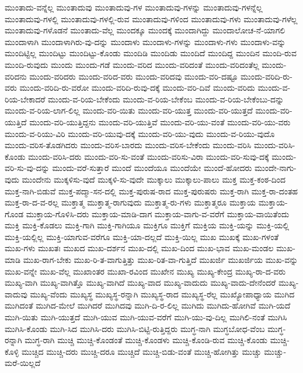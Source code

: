 {ಮುಂತಾದು-ವನ್ನೆಲ್ಲ
ಮುಂತಾದುವು
ಮುಂತಾದುವು-ಗಳ
ಮುಂತಾದುವು-ಗಳನ್ನು
ಮುಂತಾದುವು-ಗಳನ್ನೆಲ್ಲ
ಮುಂತಾದುವು-ಗಳಲ್ಲಿ
ಮುಂತಾದುವು-ಗಳಲ್ಲಿ-ರುವ
ಮುಂತಾದುವು-ಗಳಿಂದ
ಮುಂತಾದುವು-ಗಳು
ಮುಂತಾದುವು-ಗಳೆಲ್ಲ
ಮುಂತಾದುವು-ಗಳೊಡನೆ
ಮುಂತಾದು-ವೆಲ್ಲ
ಮುಂದಕ್ಕೂ
ಮುಂದಕ್ಕೆ
ಮುಂದಾಗಿದ್ದು
ಮುಂದಾಲೋಚ-ನೆ-ಯಾಗಲಿ
ಮುಂದಾಳಾಗಿ
ಮುಂದಾಳಾಗಿರು-ವು-ದನ್ನು
ಮುಂದಾಳು
ಮುಂದಾಳು-ಗಳನ್ನು
ಮುಂದಾಳು-ಗಳು
ಮುಂದಾಳು-ವನ್ನು
ಮುಂದಿಟ್ಟಿಲ್ಲ
ಮುಂದಿಟ್ಟು
ಮುಂದಿಟ್ಟು-ಕೊಂಡು
ಮುಂದಿಡಿ
ಮುಂದಿಡು
ಮುಂದಿದೆ
ಮುಂದಿದ್ದ
ಮುಂದಿನ
ಮುಂದಿ-ರುವ
ಮುಂದಿ-ರುವುದು
ಮುಂದು
ಮುಂದು-ಗಡೆ
ಮುಂದು-ವರಿದ
ಮುಂದು-ವರಿದಂತೆ
ಮುಂದು-ವರಿದಂತೆಲ್ಲ
ಮುಂದು-ವರಿದನು
ಮುಂದು-ವರಿದರು
ಮುಂದು-ವರಿದ-ವರು
ಮುಂದು-ವರಿದವು
ಮುಂದು-ವರಿ-ದಷ್ಟೂ
ಮುಂದು-ವರಿದಿ-ರು-ವರು
ಮುಂದು-ವರಿದಿ-ರು-ವರೋ
ಮುಂದು-ವರಿದಿ-ರುವು-ದಕ್ಕೆ
ಮುಂದು-ವರಿ-ದಿವೆ
ಮುಂದು-ವರಿದು
ಮುಂದು-ವ-ರಿಯ-ಬೇಕಾದರೆ
ಮುಂದು-ವ-ರಿಯ-ಬೇಕೆಂದು
ಮುಂದು-ವ-ರಿಯ-ಬೇಕೆಂಬ
ಮುಂದು-ವ-ರಿಯ-ಬೇಕೆಂಬು-ದನ್ನು
ಮುಂದು-ವ-ರಿಯ-ಲಾಗ-ಲಿಲ್ಲ
ಮುಂದು-ವರಿ-ಯಿತು
ಮುಂದು-ವರಿ-ಯುತ್ತ
ಮುಂದು-ವರಿ-ಯುತ್ತದೆ
ಮುಂದು-ವರಿ-ಯುತ್ತಿದೆ
ಮುಂದು-ವರಿ-ಯುತ್ತಿದ್ದನು
ಮುಂದು-ವರಿ-ಯುತ್ತಿವೆ
ಮುಂದು-ವರಿ-ಯು-ವಂತೆ
ಮುಂದು-ವರಿ-ಯು-ವರು
ಮುಂದು-ವ-ರಿಯು-ವಿರಿ
ಮುಂದು-ವರಿ-ಯುವು-ದಕ್ಕೆ
ಮುಂದು-ವರಿ-ಯು-ವುದು
ಮುಂದು-ವ-ರಿಯು-ವುದೊ
ಮುಂದು-ವರಿಸ-ತೊಡಗಿದರು
ಮುಂದು-ವರಿಸ-ಬಾರದು
ಮುಂದು-ವರಿಸ-ಬೇಕೆಂದು
ಮುಂದು-ವರಿಸಿ
ಮುಂದು-ವರಿಸಿ-ಕೊಂಡು
ಮುಂದು-ವರಿಸಿ-ದರು
ಮುಂದು-ವರಿ-ಸು-ವಂತೆ
ಮುಂದು-ವರಿಸು-ವಿರಾ
ಮುಂದು-ವರಿ-ಸುವು-ದಕ್ಕೆ
ಮುಂದು-ವರಿ-ಸು-ವು-ದನ್ನು
ಮುಂದು-ವರೆ-ಸುತ್ತಾರೆ
ಮುಂದೆ
ಮುಂದೆಯೂ
ಮುಂದೆಯೇ
ಮುಂದೆ-ಹೋದರು
ಮುಂದೇ-ನಾಗು-ವುದು
ಮುಂದೇನು
ಮುಕ್ಕಳಿಸು-ವುದೆ
ಮುಕ್ಕಳಿ-ಸು-ವುದೇ
ಮುಕ್ಕಾಲು
ಮುಕ್ಕಾಲು-ಪಾಲು
ಮುಕ್ತ
ಮುಕ್ತ-ಕಂಠ-ದಿಂದ
ಮುಕ್ತ-ನಾಗಿ-ಬಿಡುವೆ
ಮುಕ್ತ-ಪದ್ಮಾ-ಸನ-ದಲ್ಲಿ
ಮುಕ್ತ-ಪುರುಷ-ರಾದ
ಮುಕ್ತ-ಪುರುಷರು
ಮುಕ್ತ-ರಾಗಿ
ಮುಕ್ತ-ರಾ-ದಂತಹ
ಮುಕ್ತ-ರಾ-ದ-ವ-ರಲ್ಲ
ಮುಕ್ತಾತ್ಮ
ಮುಕ್ತಾತ್ಮ-ರಾಗುವುದು
ಮುಕ್ತಾತ್ಮ-ರು-ಗಳು
ಮುಕ್ತಾತ್ಮರೂ
ಮುಕ್ತಾಯ
ಮುಕ್ತಾಯ-ಗೊಂಡ
ಮುಕ್ತಾಯ-ಗೊಳಿಸಿ-ದರು
ಮುಕ್ತಾಯ-ಮಾಡಿ-ದಾಗ
ಮುಕ್ತಾಯ-ವಾಗು-ವ-ವರೆಗೆ
ಮುಕ್ತಾಯ-ವಾಯಿತೆಂದು
ಮುಕ್ತಿ
ಮುಕ್ತಿ-ಕೊಡಲು
ಮುಕ್ತಿ-ಗಾಗಿ
ಮುಕ್ತಿ-ಗಾಗಿಯೂ
ಮುಕ್ತಿಗೂ
ಮುಕ್ತಿಗೆ
ಮುಕ್ತಿಯ
ಮುಕ್ತಿ-ಯನ್ನು
ಮುಕ್ತಿ-ಯಲ್ಲಿ
ಮುಕ್ತಿ-ಯಲ್ಲಿಲ್ಲ
ಮುಕ್ತಿ-ಯಾಗುವ-ವರೆಗೂ
ಮುಕ್ತಿ-ಯಾ-ದಲ್ಲದೆ
ಮುಕ್ತಿ-ಯಿಲ್ಲ
ಮುಖ
ಮುಖಕ್ಕೆ
ಮುಖ-ಗಳಂತೆ
ಮುಖ-ಗಳು
ಮುಖತಃ
ಮುಖದ
ಮುಖ-ದರ್ಶನ
ಮುಖ-ದಲ್ಲಿ
ಮುಖ-ದಿಂದ
ಮುಖ-ಭಾವ
ಮುಖ-ಮಂಡಲ
ಮುಖ-ಮಾಡಿ
ಮುಖ-ರಾಗ-ಬೇಕು
ಮುಖ-ರಿ-ತ-ವಾಗುತ್ತಿತ್ತು
ಮುಖ-ರಿತ-ವಾ-ಗುತ್ತಿದೆ
ಮುಖರ್ಜಿ
ಮುಖರ್ಜಿಯ
ಮುಖ-ವನ್ನು
ಮುಖ-ವನ್ನೇ
ಮುಖ-ವೆಲ್ಲ
ಮುಖಾಂತರ
ಮುಖಾ-ರವಿಂದ
ಮುಖೇನ
ಮುಖ್ಯ
ಮುಖ್ಯ-ಕೇಂದ್ರ
ಮುಖ್ಯ-ರಾ-ದ-ವರು
ಮುಖ್ಯ-ವಾಗಿ
ಮುಖ್ಯ-ವಾಗಿತ್ತೊ
ಮುಖ್ಯ-ವಾಗಿದೆ
ಮುಖ್ಯ-ವಾದ
ಮುಖ್ಯ-ವಾದುದು
ಮುಖ್ಯ-ವಾದು-ದೇನೆಂದರೆ
ಮುಖ್ಯ-ವಾದುವು
ಮುಖ್ಯ-ವೆಂದು
ಮುಖ್ಯಸ್ಥ
ಮುಖ್ಯಸ್ಥ-ರನ್ನಾಗಿ
ಮುಖ್ಯಸ್ಥ-ರಾದ
ಮುಖ್ಯಸ್ಥ-ರೆಲ್ಲ
ಮುಖ್ಯೋಪಾಧ್ಯಾಯ
ಮುಗಿದ
ಮುಗಿದಂತೆ
ಮುಗಿದ-ಮೇಲೆ
ಮುಗಿದರೆ
ಮುಗಿದವು
ಮುಗಿ-ದಿ-ರ-ಲಿಲ್ಲ
ಮುಗಿದು
ಮುಗಿದು-ಹೋಗಿವೆ
ಮುಗಿ-ಯದೆ
ಮುಗಿ-ಯಿತು
ಮುಗಿ-ಯುತ್ತದೆ
ಮುಗಿ-ಯುವ
ಮುಗಿ-ಯುವ-ವರೆಗೆ
ಮುಗಿ-ಯು-ವು-ದಿಲ್ಲ
ಮುಗಿಲಿ-ನಂತೆ
ಮುಗಿಸಿ
ಮುಗಿಸಿ-ಕೊಂಡು
ಮುಗಿ-ಸಿದ
ಮುಗಿಸಿ-ದರು
ಮುಗಿಸಿ-ಬಿಟ್ಟಿ-ರುತ್ತಿದ್ದರು
ಮುಗ್ಧ-ನಾಗಿ
ಮುಗ್ಧಬೋಧ-ವೆಂಬ
ಮುಗ್ಧ-ರನ್ನಾಗಿ
ಮುಗ್ಧ-ರಾಗಿ
ಮುಚ್ಚಿ
ಮುಚ್ಚಿ-ಕೊಂಡಂತೆ
ಮುಚ್ಚಿ-ಕೊಂಡಳು
ಮುಚ್ಚಿ-ಕೊಂಡಿ-ರುವ
ಮುಚ್ಚಿ-ಕೊಂಡು
ಮುಚ್ಚಿ-ಕೊಳ್ಳಿ
ಮುಚ್ಚಿದ
ಮುಚ್ಚಿ-ದರು
ಮುಚ್ಚಿ-ದರೂ
ಮುಚ್ಚಿದೆ
ಮುಚ್ಚಿ-ಬಿಡು-ವಂತೆ
ಮುಚ್ಚಿ-ಹೋಗಿತ್ತು
ಮುಚ್ಚು
ಮುಚ್ಚು-ಮರೆ-ಯಿಲ್ಲದೆ
}
